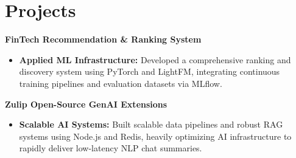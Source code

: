 \documentclass[11pt,a4paper]{article}
\begin{document}
\vspace{-5pt}
\section{Projects}
\noindent
\textbf{FinTech Recommendation \& Ranking System}
\begin{itemize}[leftmargin=*,noitemsep,topsep=0pt]
    \item \textbf{Applied ML Infrastructure:} Developed a comprehensive ranking and discovery system using PyTorch and LightFM, integrating continuous training pipelines and evaluation datasets via MLflow.
\end{itemize}

\vspace{3pt}
\noindent
\textbf{Zulip Open-Source GenAI Extensions}
\begin{itemize}[leftmargin=*,noitemsep,topsep=0pt]
    \item \textbf{Scalable AI Systems:} Built scalable data pipelines and robust RAG systems using Node.js and Redis, heavily optimizing AI infrastructure to rapidly deliver low-latency NLP chat summaries.
\end{itemize}
\end{document}
